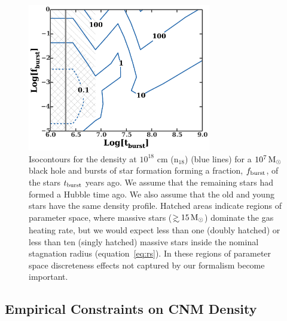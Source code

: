 \documentclass[usenatbib,fleqn]{mnras}
\newcommand\gsim{\mathrel{\rlap{\lower4pt\hbox{\hskip1pt$\sim$}}
    \raise1pt\hbox{$>$}}}
\newcommand{\Msun}{{\rm M_\odot}}
\begin{document}
\begin{figure} 
  \includegraphics[width=8cm]{cnm_plot.pdf}
  \caption{\label{fig:param} Isocontours for the density at $10^{18}$
    cm ($\mathrm{n_{18}}$) (blue lines) for a $10^{7} \, \Msun$ black
    hole and bursts of star formation forming a fraction, $f_{\rm
      burst}$, of the stars $t_{\rm burst}$ years ago. We assume that
    the remaining stars had formed a Hubble time ago. We also assume
    that the old and young stars have the same density profile.
    Hatched areas indicate regions of parameter space, where massive
    stars ($\gsim 15 \, \Msun$) dominate the gas heating rate, but we
    would expect less than one (doubly hatched) or less than ten
    (singly hatched) massive stars inside the nominal stagnation
    radius (equation~\ref{eq:rs}). In these regions of parameter
    space discreteness effects not captured by our formalism become
    important.}
\end{figure}



\subsection{Empirical Constraints on CNM Density}
\label{sec:empirical}
\end{document}
